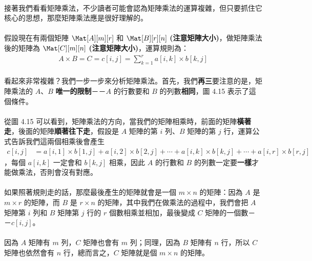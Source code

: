 \documentclass[12pt,a4paper,oneside]{report}
\begin{document}
\begin{CJK}{UTF8}{bkai}
\paragraph{}接著我們看看矩陣乘法，不少讀者可能會認為矩陣乘法的運算複雜，但只要抓住它核心的思想，那麼矩陣乘法應是很好理解的。

\paragraph{}假設現在有兩個矩陣 $\Mat[A][m][r]$ 和 $\Mat[B][r][n]$ \textbf{(注意矩陣大小)}，做矩陣乘法後的矩陣為 $\Mat[C][m][n]$ \textbf{(注意矩陣大小)}，運算規則為：
\begin{align*}
A\times{B}=C=c[i,j]=\sum^{r}_{k=1}{a[i,k]\times{b[k,j]}}
\end{align*}

\paragraph{}看起來非常複雜？我們一步一步來分析矩陣乘法。首先，我們\textbf{再三}要注意的是，矩陣乘法的 $A$、$B$ \textbf{唯一的限制}－－$A$ 的行數要和 $B$ 的列數\textbf{相同}，圖 4.15 表示了這個條件。

\paragraph{}從圖 4.15 可以看到，矩陣乘法的方向，當我們的矩陣相乘時，前面的矩陣\textbf{橫著走}，後面的矩陣\textbf{順著往下走}，假設是 $A$ 矩陣的第 $i$ 列、$B$ 矩陣的第 $j$ 行，運算公式告訴我們這兩個相乘後會產生
\begin{align*}
c[i,j] &= a[i,1]\times{b[1,j]}+a[i,2]\times{b[2,j]}+\cdots{}+a[i,k]\times{b[k,j]}+\cdots{}+a[i,r]\times{b[r, j]}
\end{align*}
，每個 $a[i,k]$ 一定會和 $b[k,j]$ 相乘，因此 $A$ 的行數和 $B$ 的列數一定要\textbf{一樣}才能做乘法，否則會沒有對應。

\paragraph{}如果照著規則走的話，那麼最後產生的矩陣就會是一個 $m\times{n}$ 的矩陣：因為 $A$ 是 $m\times{r}$ 的矩陣，而 $B$ 是 $r\times{n}$ 的矩陣，其中我們在做乘法的過程中，我們會把 $A$ 矩陣第 $i$ 列和 $B$ 矩陣第 $j$ 行的 $r$ 個數相乘並相加，最後變成 $C$ 矩陣的一個數－－$c[i,j]$。

\paragraph{}因為 $A$ 矩陣有 $m$ 列，$C$ 矩陣也會有 $m$ 列；同理，因為 $B$ 矩陣有 $n$ 行，所以 $C$ 矩陣也依然會有 $n$ 行，總而言之，$C$ 矩陣就是個 $m\times{n}$ 的矩陣。


\end{CJK}
\end{document}
